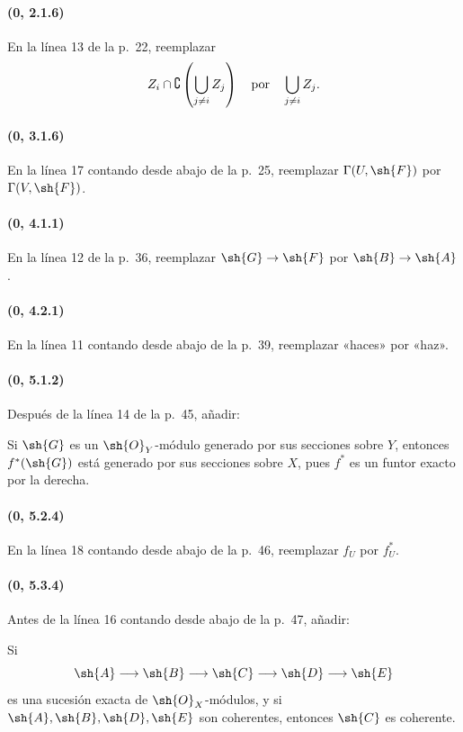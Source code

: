 \documentclass[oneside,10pt]{amsart}
\makeatletter
\newcommand{\ega@arrow}[2]{\mathchoice{#1}{#2}{#2}{#2}}
\renewcommand{\to}{\ega@arrow{\longrightarrow}{\rightarrow}}
\makeatother
\begin{document}
\paragraph{(0, 2.1.6)}
En la línea 13 de la p.~22, reemplazar
\[
  Z_i\cap\complement\left(\bigcup_{j\ne i}Z_j\right)
  \quad\hbox{por}\quad
  \bigcup_{j\ne i}Z_j.
\]

\paragraph{(0, 3.1.6)}
En la línea 17 contando desde abajo de la p.~25, reemplazar
$\Gamma(U,\sh{F})$ por $\Gamma(V,\sh{F})$.

\paragraph{(0, 4.1.1)}
En la línea 12 de la p.~36, reemplazar $\sh{G}\to\sh{F}$ por
$\sh{B}\to\sh{A}$.

\paragraph{(0, 4.2.1)}
En la línea 11 contando desde abajo de la p.~39, reemplazar «haces» por
«haz».

\paragraph{(0, 5.1.2)}
Después de la línea 14 de la p.~45, añadir:

Si $\sh{G}$ es un $\sh{O}_Y$-módulo generado por sus secciones sobre
$Y$, entonces $f^*(\sh{G})$ está generado por sus secciones sobre $X$,
pues $f^*$ es un funtor exacto por la derecha.

\paragraph{(0, 5.2.4)}
En la línea 18 contando desde abajo de la p.~46, reemplazar $f_U$ por
$f_U^*$.

\paragraph{(0, 5.3.4)}
Antes de la línea 16 contando desde abajo de la p.~47, añadir:

Si
\[
  \sh{A}\to\sh{B}\to\sh{C}\to\sh{D}\to\sh{E}
\]
es una sucesión exacta de $\sh{O}_X$-módulos, y si
$\sh{A},\sh{B},\sh{D},\sh{E}$ son coherentes, entonces $\sh{C}$ es
coherente.
\end{document}
